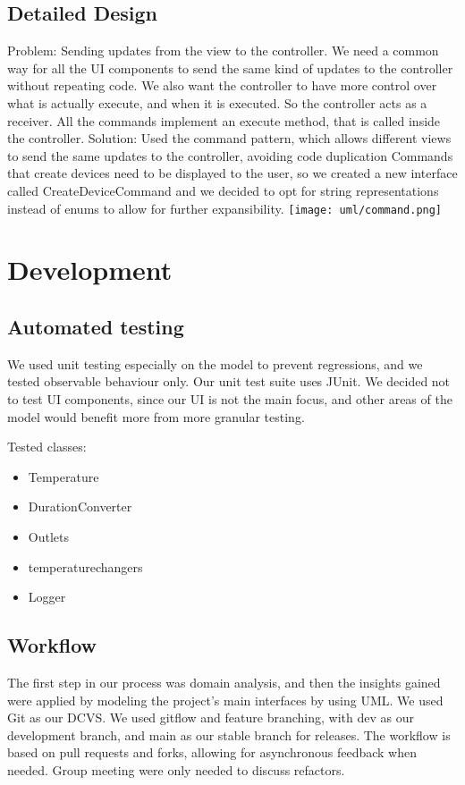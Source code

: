 \documentclass[a4paper,12pt]{report}
\begin{document}
\section{Detailed Design}
Problem: Sending updates from the view to the controller. 
We need a common way for all the UI components to send the same kind of updates to the controller without repeating code.
We also want the controller to have more control over what is actually execute, and when it is executed. So the controller acts as a receiver.
All the commands implement an execute method, that is called inside the controller.
Solution: Used the command pattern, which allows %
different views to send the same updates to the controller, avoiding code duplication
Commands that create devices need to be displayed to the user, so we created a new interface called CreateDeviceCommand
and we decided to opt for string representations instead of enums to allow for further expansibility.
\newline
\texttt{[image: uml/command.png]}






\chapter{Development}
\section{Automated testing}
We used unit testing especially on the model to prevent regressions, and we tested observable behaviour only.
Our unit test suite uses JUnit.
We decided not to test UI components, since our UI is not the main focus,
and other areas of the model would benefit more from more granular testing. 

Tested classes:
\begin{itemize}
	\item Temperature
	\item DurationConverter
	\item Outlets
	\item temperaturechangers
	\item Logger
\end{itemize}




\section{Workflow}
The first step in our process was domain analysis, and then the insights gained were applied by modeling 
the project's main interfaces by using UML.
We used Git as our DCVS. We used gitflow and feature branching, with dev as our development branch,
and main as our stable branch for releases. The workflow is based on pull requests and forks, allowing for asynchronous feedback when needed.
Group meeting were only needed to discuss refactors. 
\end{document}
